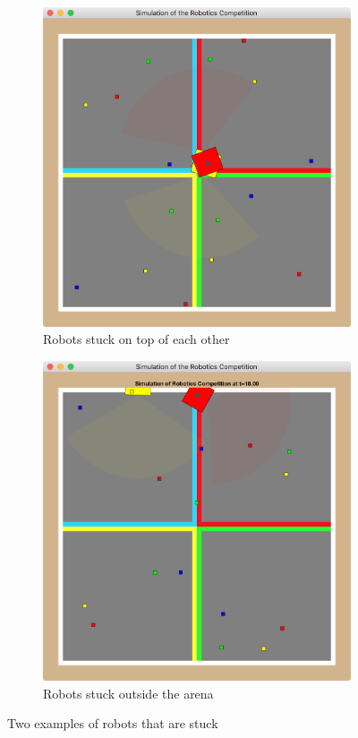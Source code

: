 \documentclass[12pt]{article}
\begin{document}
\begin{figure}
  \begin{subfigure}{.5\textwidth}
    \centering
    \includegraphics[width=.75\linewidth]{images/arena-3.png}
    \caption{Robots stuck on top of each other}
    \label{fig:arena-stuck-1}
  \end{subfigure}
  \begin{subfigure}{.5\textwidth}
    \centering
    \includegraphics[width=.75\linewidth]{images/arena-4.png}
    \caption{Robots stuck outside the arena}
    \label{fig:arena-stuck-2}
  \end{subfigure}
  \caption{Two examples of robots that are stuck}
  \label{fig:arena-stuck}
\end{figure}
\end{document}
